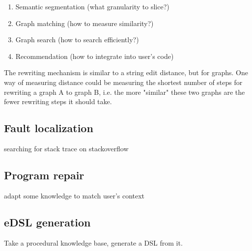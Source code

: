 \documentclass[11pt]{article}
\begin{document}
    \begin{enumerate}
        \item Semantic segmentation (what granularity to slice?)
        \item Graph matching (how to measure similarity?)
        \item Graph search (how to search efficiently?)
        \item Recommendation (how to integrate into user's code)
    \end{enumerate}

    The rewriting mechanism is similar to a string edit distance, but for graphs. One way of measuring distance could be measuring the shortest number of steps for rewriting a graph A to graph B, i.e. the more "similar" these two graphs are the fewer rewriting steps it should take.

    \subsection{Fault localization}

    searching for stack trace on stackoverflow

    \subsection{Program repair}

    adapt some knowledge to match user's context

    \subsection{eDSL generation}

    Take a procedural knowledge base, generate a DSL from it.

    \pagebreak
    
    
\end{document}

